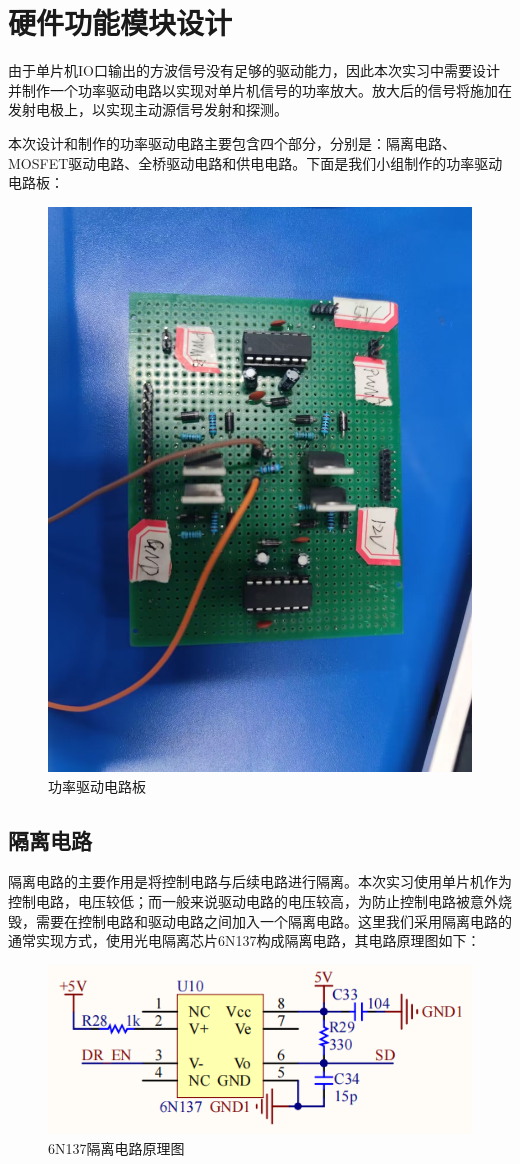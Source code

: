 \documentclass[UTF8]{article}
\begin{document}
%
\section{硬件功能模块设计}
由于单片机IO口输出的方波信号没有足够的驱动能力，因此本次实习中需要设计并制作一个功率驱动电路以实现对单片机信号的功率放大。放大后的信号将施加在发射电极上，以实现主动源信号发射和探测。

本次设计和制作的功率驱动电路主要包含四个部分，分别是：隔离电路、MOSFET驱动电路、全桥驱动电路和供电电路。下面是我们小组制作的功率驱动电路板：
\begin{figure}[H]
    \centering %
    \includegraphics[width=.5\textwidth]{figure/功率驱动板.jpg} 
    \caption{功率驱动电路板} %
\end{figure}

\subsection{隔离电路}
隔离电路的主要作用是将控制电路与后续电路进行隔离。本次实习使用单片机作为控制电路，电压较低；而一般来说驱动电路的电压较高，为防止控制电路被意外烧毁，需要在控制电路和驱动电路之间加入一个隔离电路。这里我们采用隔离电路的通常实现方式，使用光电隔离芯片6N137构成隔离电路，其电路原理图如下：
\begin{figure}[H]
    \centering %
    \includegraphics[width=.8\textwidth]{figure/隔离电路.png} 
    \caption{6N137隔离电路原理图} %
\end{figure}
\end{document}
